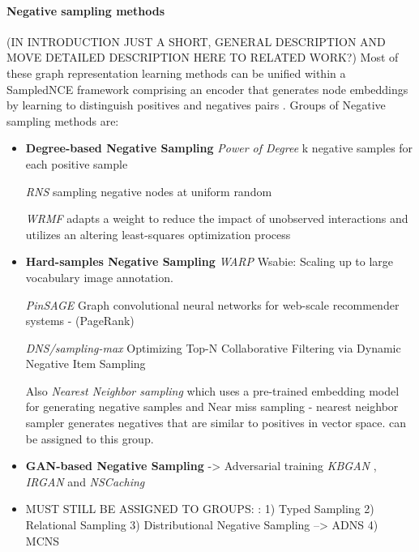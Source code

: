 \paragraph{Negative sampling methods}  
(IN INTRODUCTION JUST A SHORT, GENERAL DESCRIPTION AND MOVE DETAILED DESCRIPTION HERE TO RELATED WORK?)
Most of these graph representation learning methods can be unified within a \ac{SampledNCE} framework
comprising an encoder that generates node embeddings by learning to distinguish positives and negatives pairs \cite{MCNS}.
Groups of Negative sampling methods are:
\begin{itemize}
    \item 
    \textbf{Degree-based Negative Sampling}
    \textit{Power of Degree} \cite{MikolovSCCD13}
    k negative samples for each positive sample

    \textit{RNS} \cite{Dupre2018Word2vec}
    sampling negative nodes at uniform random
    
    \textit{WRMF} 
    adapts a weight to reduce the impact of unobserved interactions and utilizes an altering least-squares optimization process \cite{MCNS}
    
    \item 
    \textbf{Hard-samples Negative Sampling}
    \textit{WARP} 
    Wsabie: Scaling up to large vocabulary image annotation.
    
     \textit{PinSAGE}
     Graph convolutional neural networks for web-scale recommender systems - (PageRank)
     
    \textit{DNS/sampling-max} 
    Optimizing Top-N Collaborative Filtering via Dynamic Negative Item Sampling
    
    Also 
    \textit{Nearest Neighbor sampling} which uses a pre-trained embedding model for generating negative samples \cite{kotnis2017analysis} and
    Near miss sampling - nearest neighbor sampler generates negatives that are similar to positives in vector space. \cite{kotnis2017analysis}
    can be assigned to this group.
    
    \item 
    \textbf{GAN-based Negative Sampling}
    -> Adversarial training
    \textit{KBGAN} \cite{cai2017kbgan}, \textit{IRGAN} and \textit{NSCaching} \cite{zhang2019nscaching}
    
    \item 
    MUST STILL BE ASSIGNED TO GROUPS:
    \cite{alam2020affinity}: 
    1) Typed Sampling
    2) Relational Sampling
    3) Distributional Negative Sampling
    --> \ac{ADNS}
    4) \ac{MCNS}
    
\end{itemize}

